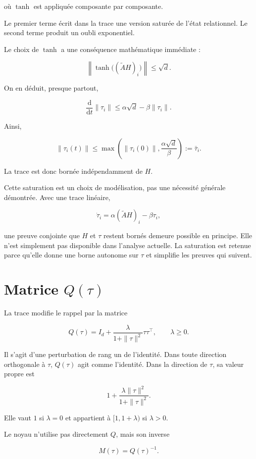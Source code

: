 où \(\tanh\) est appliquée composante par composante.

Le premier terme écrit dans la trace une version saturée de l'état relationnel. Le second terme produit un oubli exponentiel.

Le choix de \(\tanh\) a une conséquence mathématique immédiate :

\[
\left\|
\tanh\!\bigl((\widetilde A H)_i\bigr)
\right\|
\leq \sqrt d.
\]

On en déduit, presque partout,

\[
\frac{\mathrm d}{\mathrm dt}\|\tau_i\|
\leq
\alpha\sqrt d-\beta\|\tau_i\|.
\]

Ainsi,

\[
\|\tau_i(t)\|
\leq
\max\left(
\|\tau_i(0)\|,
\frac{\alpha\sqrt d}{\beta}
\right)
:=\bar\tau_i.
\]

La trace est donc bornée indépendamment de \(H\).

Cette saturation est un choix de modélisation, pas une nécessité générale démontrée. Avec une trace linéaire,

\[
\dot\tau_i=\alpha(\widetilde A H)_i-\beta\tau_i,
\]

une preuve conjointe que \(H\) et \(\tau\) restent bornés demeure possible en principe. Elle n'est simplement pas disponible dans l'analyse actuelle. La saturation est retenue parce qu'elle donne une borne autonome sur \(\tau\) et simplifie les preuves qui suivent.

\section{Matrice \texorpdfstring{\(Q(\tau)\)}{Q(tau)}}\label{t1-matrice-qtau}

La trace modifie le rappel par la matrice

\[
Q(\tau)
=
I_d+
\frac{\lambda}{1+\|\tau\|^2}\tau\tau^\top,
\qquad
\lambda\geq 0.
\]

Il s'agit d'une perturbation de rang un de l'identité. Dans toute direction orthogonale à \(\tau\), \(Q(\tau)\) agit comme l'identité. Dans la direction de \(\tau\), sa valeur propre est

\[
1+\frac{\lambda\|\tau\|^2}{1+\|\tau\|^2}.
\]

Elle vaut \(1\) si \(\lambda=0\) et appartient à \([1,1+\lambda)\) si \(\lambda>0\).

Le noyau n'utilise pas directement \(Q\), mais son inverse

\[
M(\tau)=Q(\tau)^{-1}.
\]

